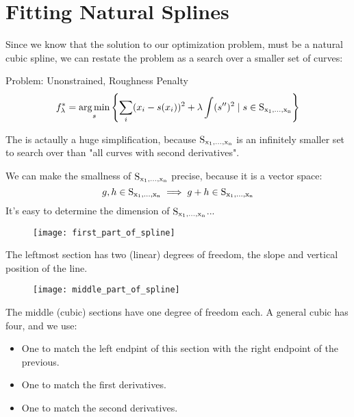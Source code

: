 \section{Fitting Natural Splines}
%
%
\begin{frame}
  Since we know that the solution to our optimization problem, must be a natural cubic spline, we can restate the problem as a search over a smaller set of curves:
  \begin{block}{Problem: Unonstrained, Roughness Penalty}
    $$ f_{\lambda}^* = \operatorname*{arg\,min}_{s} \left\{ \sum_i (x_i - s(x_i))^2 + \lambda \int (s'')^2 \mid s \in \operatorname*{S_{x_1, \ldots, x_n}} \right\} $$
  \end{block}
\end{frame}
%
%
\begin{frame}
  The is actaully a huge simplification, because $\operatorname*{S_{x_1, \ldots, x_n}}$ is an infinitely smaller set to search over than "all curves with second derivatives".
\end{frame}
%
%
\begin{frame}
  We can make the smallness of $\operatorname*{S_{x_1, \ldots, x_n}}$ precise, because it is a vector space:
  $$ g, h \in \operatorname*{S_{x_1, \ldots, x_n}} \implies g + h \in \operatorname*{S_{x_1, \ldots, x_n}} $$
  It's easy to determine the dimension of $\operatorname*{S_{x_1, \ldots, x_n}}$... 
\end{frame}
%
%
\begin{frame}
	\begin{figure}
    \texttt{[image: first\_part\_of\_spline]}
	\end{figure}
  The leftmost section has two (linear) degrees of freedom, the slope and vertical position of the line.
\end{frame}
%
%
\begin{frame}
	\begin{figure}
    \texttt{[image: middle\_part\_of\_spline]}
	\end{figure}
  The middle (cubic) sections have one degree of freedom each.  A general cubic has four, and we use:
  \begin{itemize}
    \item One to match the left endpint of this section with the right endpoint of the previous.
    \item One to match the first derivatives.
    \item One to match the second derivatives.
  \end{itemize}
\end{frame}
%
%
